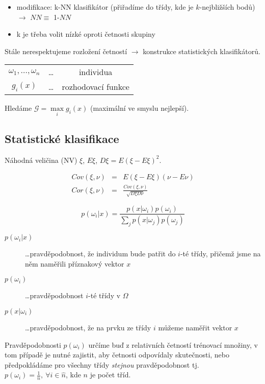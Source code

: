 \begin{itemize}
\item modifikace: k-NN klasifikátor (přiřadíme do třídy, kde je $k$-nejbližších bodů)  $\rightarrow$ $NN\equiv$ 1-$NN$
\item k je třeba volit nízké oproti četnosti skupiny
\end{itemize}

Stále nerespektujeme rozložení četností $\rightarrow$ konstrukce statistických klasifikátorů.

\begin{tabular}{ccc}
$\omega_1,\dots,\omega_n$ &\dots& individua\\
$g_i(x)$ &\dots& rozhodovací funkce
\end{tabular}

Hledáme $\mathcal{G}=\max\limits_i g_i(x)$ (maximální ve smyslu nejlepší).

\subsection{Statistické klasifikace}

Náhodná veličina (NV) $\xi$, $E\xi$, $D\xi=E\left(\xi-E\xi\right)^2$.

\begin{eqnarray}
Cov(\xi,\nu)&=&E(\xi-E\xi)(\nu-E\nu)\\
Cor(\xi,\nu)&=&\frac{Cov(\xi,\nu)}{\sqrt{D\xi D\nu}}
\end{eqnarray}


\begin{equation}
p(\omega_i|x)=\frac{p(x|\omega_i)p(\omega_i)}{\sum\limits_j p(x|\omega_j)p(\omega_j)}
\end{equation}

\begin{description}
\item[$p(\omega_i|x)$] \dots  pravděpodobnost, že individum bude patřit do $i$-té třídy, přičemž 
jsme na něm naměřili příznakový vektor $x$
\item[$p(\omega_i)$] \dots pravděpodobnost $i$-té třídy v $\Omega$
\item[$p(x|\omega_i)$] \dots  pravděpodobnost, že na prvku ze třídy $i$ můžeme naměřit vektor  $x$
\end{description}

Pravděpodobnosti $p(\omega_i)$ určíme buď z relativních četností trénovací množiny, v tom případě je nutné
zajistit, aby četnosti odpovídaly skutečnosti, nebo předpokládáme pro všechny třídy {\em stejnou} pravděpodobnost
tj. $p(\omega_i)=\frac{1}{n},\ \forall i\in \hat{n}$, kde $n$ je počet tříd.

